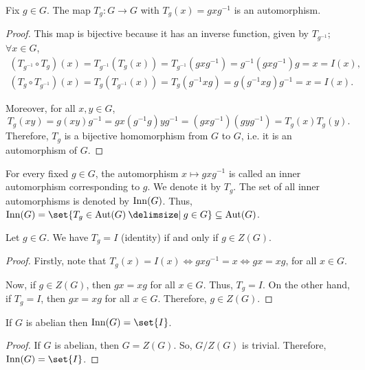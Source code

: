 \documentclass[11pt]{penrose}
\begin{document}
\begin{nprop}
    Fix $g \in G$. The map $T_{g} : G \to G$ with $T_{g}(x) = g x g^{-1}$ is an automorphism.
\end{nprop}
\begin{proof}
    This map is bijective because it has an inverse function, given by $T_{g^{-1}}$; $\forall x \in G$,
    \begin{gather*}
        (T_{g^{-1}} \circ T_{g}) (x) = T_{g^{-1}}( T_{g}(x) ) = T_{g^{-1}}( g x g^{-1} ) = g^{-1} ( g x g^{-1} ) g = x = I(x),\\
        (T_{g} \circ T_{g^{-1}}) (x) = T_{g}( T_{g^{-1}}(x) ) = T_{g}( g^{-1} x g ) = g ( g^{-1} x g ) g^{-1} = x = I(x).
    \end{gather*}

    Moreover, for all $x, y \in G$,
    \begin{equation*}
        T_{g} (xy) = g (xy) g^{-1} = g x (g^{-1}g) y g^{-1} = (g x g^{-1})(g y g^{-1}) = T_{g}(x) T_{g}(y).
    \end{equation*}
    Therefore, $T_{g}$ is a bijective homomorphism from $G$ to $G$, i.e. it is an automorphism of $G$.
\end{proof}

\begin{ndfn}
    For every fixed $g \in G$, the automorphism $x \mapsto g x g^{-1}$ is called an inner automorphism corresponding to $g$. We denote it by $T_{g}$. The set of all inner automorphisms is denoted by $\operatorname{Inn}(G)$. Thus, $\Inn(G) = \set{T_{g} \in \Aut(G) \st g \in G} \subseteq \Aut(G)$.
\end{ndfn}

\begin{nprop}
    Let $g \in G$. We have $T_{g} = I$ (identity) if and only if $g \in Z(G)$.
\end{nprop}
\begin{proof}
    Firstly, note that $T_{g}(x) = I(x) \iff g x g^{-1} = x \iff g x = x g$, for all $x \in G$.

    Now, if $g \in Z(G)$, then $gx = xg$ for all $x \in G$. Thus, $T_{g} = I$. On the other hand, if $T_{g} = I$, then $gx = xg$ for all $x \in G$. Therefore, $g \in Z(G)$.
\end{proof}

\begin{ncor}
    If $G$ is abelian then $\Inn(G) = \set{I}$.
\end{ncor}
\begin{proof}
    If $G$ is abelian, then $G = Z(G)$. So, $G/Z(G)$ is trivial. Therefore, $\Inn(G) = \set{I}$.
\end{proof}
\end{document}
